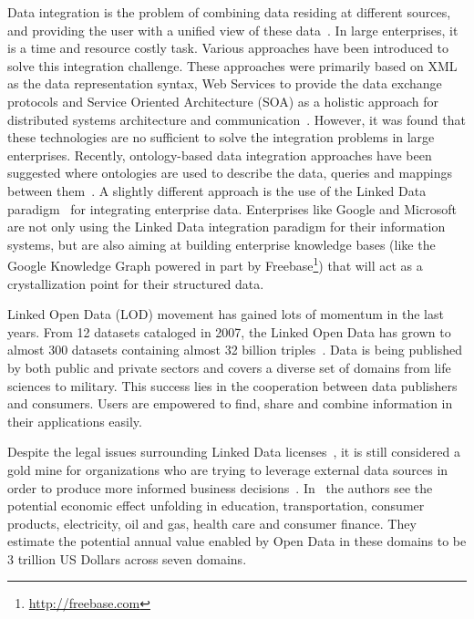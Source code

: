 \documentclass[onecolumn, crcready]{../../Util/LaTEX/iosart2c}
\begin{document}
Data integration is the problem of combining data residing at different sources, and providing the user with a unified view of these data~\cite{Lenzerini:SIGMOD:02}. In large enterprises, it is a time and resource costly task. Various approaches have been introduced to solve this integration challenge. These approaches were primarily based on XML as the data representation syntax, Web Services to provide the data exchange protocols and Service Oriented Architecture (SOA) as a holistic approach for distributed systems architecture and communication~\cite{Frischmuth:ISWC:13,Frischmuth:SemWebJorunal:12}. However, it was found that these technologies are no sufficient to solve the integration problems in large enterprises. Recently, ontology-based data integration approaches have been suggested where ontologies are used to describe the data, queries and mappings between them~\cite{Wache:IJCAI:01}. A slightly different approach is the use of the Linked Data paradigm~\cite{Bizer:IJSWIS:09} for integrating enterprise data. Enterprises like Google and Microsoft are not only using the Linked Data integration paradigm for their information systems, but are also aiming at building enterprise knowledge bases (like the Google Knowledge Graph powered in part by Freebase\footnote{\url{http://freebase.com}}) that will act as a crystallization point for their structured data.

Linked Open Data (LOD) movement has gained lots of momentum in the last years. From 12 datasets cataloged in 2007, the Linked Open Data has grown to almost 300 datasets containing almost 32 billion triples~\cite{Jentzsch:SOLOD:11}. Data is being published by both public and private sectors and covers a diverse set of domains from life sciences to military. This success lies in the cooperation between data publishers and consumers. Users are empowered to find, share and combine information in their applications easily.

Despite the legal issues surrounding Linked Data licenses~\cite{Prateek:Misc:13}, it is still considered a gold mine for organizations who are trying to leverage external data sources in order to produce more informed business decisions~\cite{Boyd:Article:11}. In~\cite{Manyika:Report:13} the authors see the potential economic effect unfolding in education, transportation, consumer products, electricity, oil and gas, health care and consumer finance. They estimate the potential annual value enabled by Open Data in these domains to be 3 trillion US Dollars across seven domains.
\end{document}
